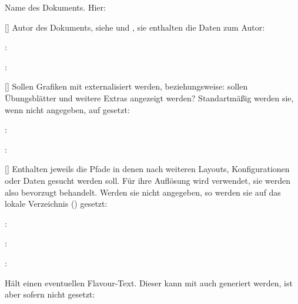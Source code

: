 %
%
%

Name des Dokuments. Hier: \LILLYxDOCUMENTNAME

%
%
%

[\cmdlist{}]
Autor des Dokuments, siehe  und , sie enthalten die Daten zum Autor:
\begin{ditemize}\narrowitems
    \item {}: \AUTHOR
    \item {}: \AUTHORMAIL
\end{ditemize}

%
%
%

[\cmdlist{}]
Sollen Grafiken mit  externalisiert werden, beziehungsweise: sollen Übungsblätter und weitere Extras angezeigt werden? Standartmäßig werden sie, wenn nicht angegeben, auf \false{} gesetzt:
\begin{ditemize}\narrowitems
    \item {}: \LILLYxEXTERNALIZE
    \item {}: \LILLYxMODExEXTRA
\end{ditemize}

%
%
%

[\cmdlist{}\cmdlist{}]
Enthalten jeweils die Pfade in denen nach weiteren Layouts, Konfigurationen oder Daten gesucht werden soll. Für ihre Auflösung wird  verwendet, sie werden also bevorzugt behandelt. Werden sie nicht angegeben, so werden sie auf das lokale Verzeichnis () gesetzt:
\begin{ditemize}\narrowitems
    \item {}: \lstshowcmd{\lillyPathLayout}
    \item {}: \lstshowcmd{\lillyPathConfig}
    \item {}: \lstshowcmd{\lillyPathData}
\end{ditemize}

%
%
%

Hält einen eventuellen Flavour-Text. Dieser kann mit  auch generiert werden, ist aber sofern nicht gesetzt: 

